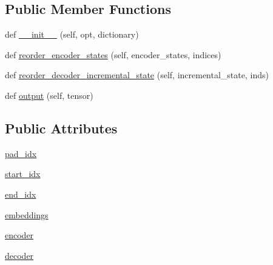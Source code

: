 \subsection*{Public Member Functions}
\begin{DoxyCompactItemize}
\item 
def \hyperlink{classparlai_1_1agents_1_1transformer_1_1modules_1_1TransformerGeneratorModel_a17276e3090a132914c0adae133e60357}{\+\_\+\+\_\+init\+\_\+\+\_\+} (self, opt, dictionary)
\item 
def \hyperlink{classparlai_1_1agents_1_1transformer_1_1modules_1_1TransformerGeneratorModel_a9b9261bca59f10692c15cbaaa3ffce65}{reorder\+\_\+encoder\+\_\+states} (self, encoder\+\_\+states, indices)
\item 
def \hyperlink{classparlai_1_1agents_1_1transformer_1_1modules_1_1TransformerGeneratorModel_a7ee3a87dd94d18353bca09990e8d5821}{reorder\+\_\+decoder\+\_\+incremental\+\_\+state} (self, incremental\+\_\+state, inds)
\item 
def \hyperlink{classparlai_1_1agents_1_1transformer_1_1modules_1_1TransformerGeneratorModel_ae0f0d3d038cc12075501aae3a059c997}{output} (self, tensor)
\end{DoxyCompactItemize}
\subsection*{Public Attributes}
\begin{DoxyCompactItemize}
\item 
\hyperlink{classparlai_1_1agents_1_1transformer_1_1modules_1_1TransformerGeneratorModel_aefac02b3630ef361bb008b4f7973c55b}{pad\+\_\+idx}
\item 
\hyperlink{classparlai_1_1agents_1_1transformer_1_1modules_1_1TransformerGeneratorModel_a381b6d63e5aba194730c36d9fb93c6d6}{start\+\_\+idx}
\item 
\hyperlink{classparlai_1_1agents_1_1transformer_1_1modules_1_1TransformerGeneratorModel_ab2b8403205fcd407e47546dc56022d2f}{end\+\_\+idx}
\item 
\hyperlink{classparlai_1_1agents_1_1transformer_1_1modules_1_1TransformerGeneratorModel_a18411754103e8c8f4cd2e9338351b98d}{embeddings}
\item 
\hyperlink{classparlai_1_1agents_1_1transformer_1_1modules_1_1TransformerGeneratorModel_af165b8ec1505f768c530aea02d68ae09}{encoder}
\item 
\hyperlink{classparlai_1_1agents_1_1transformer_1_1modules_1_1TransformerGeneratorModel_a6467f0fdec226329cb8efe77245996a5}{decoder}
\end{DoxyCompactItemize}


